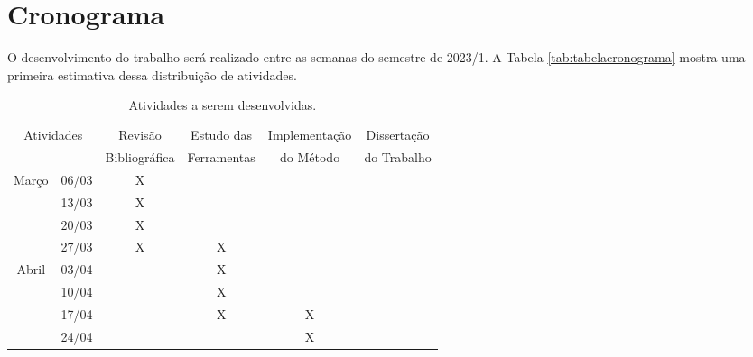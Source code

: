 \chapter{Cronograma}\label{cap:cronograma}

O desenvolvimento do trabalho será realizado entre as semanas do semestre de 2023/1. A Tabela \ref{tab:tabelacronograma} mostra uma primeira estimativa dessa distribuição de atividades.

\begin{table}[h]
    \caption{Atividades a serem desenvolvidas.}
    \centering
    \begin{tabular}{|cc|c|c|c|c|}
        \hline
        \multicolumn{2}{|c|}{Atividades}             & Revisão       & Estudo das  & Implementação & Dissertação     \\
        \multicolumn{2}{|c|}{}                       & Bibliográfica & Ferramentas & do Método     & do Trabalho     \\ \hline
        \multicolumn{1}{|c|}{\multirow{4}{*}{Março}} & 06/03         & X           &               &             &   \\ \cline{2-6}
        \multicolumn{1}{|c|}{}                       & 13/03         & X           &               &             &   \\ \cline{2-6}
        \multicolumn{1}{|c|}{}                       & 20/03         & X           &               &             &   \\ \cline{2-6}
        \multicolumn{1}{|c|}{}                       & 27/03         & X           & X             &             &   \\ \hline
        \multicolumn{1}{|c|}{\multirow{4}{*}{Abril}} & 03/04         &             & X             &             &   \\ \cline{2-6}
        \multicolumn{1}{|c|}{}                       & 10/04         &             & X             &             &   \\ \cline{2-6}
        \multicolumn{1}{|c|}{}                       & 17/04         &             & X             & X           &   \\ \cline{2-6}
        \multicolumn{1}{|c|}{}                       & 24/04         &             &               & X           &   \\ \hline

\end{tabular}
\end{table}
